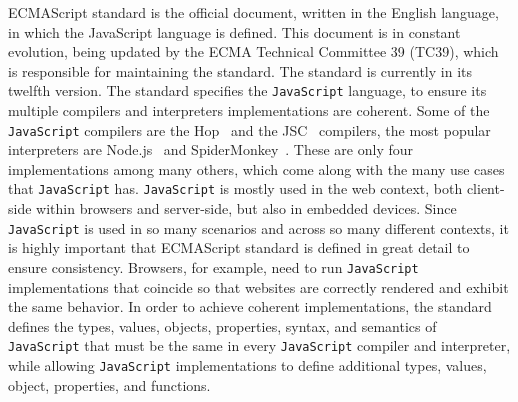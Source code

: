 \documentclass[runningheads]{llncs}
\begin{document}
ECMAScript standard\cite{ECMAScript} is the official document, written in the English language, in which the JavaScript language is defined. This document is in constant evolution, being updated by the ECMA Technical Committee 39 (TC39), which is responsible for maintaining the standard. The standard is currently in its twelfth version. 
%
The standard specifies the \texttt{JavaScript} language, to ensure its multiple compilers and interpreters implementations are coherent. Some of the \texttt{JavaScript} compilers are the Hop~\cite{Hop} and the JSC~\cite{JSC} compilers, the most popular interpreters are Node.js~\cite{Node.js} and SpiderMonkey~\cite{SpiderMonkey}. These are only four implementations among many others, which come along with the many use cases that \texttt{JavaScript} has.
%
\texttt{JavaScript} is mostly used in the web context, both client-side within browsers and server-side, but also in embedded devices. Since \texttt{JavaScript} is used in so many scenarios and across so many different contexts, it is highly important that ECMAScript standard is defined in great detail to ensure consistency. Browsers, for example, need to run \texttt{JavaScript} implementations that coincide so that websites are correctly rendered and exhibit the same behavior. In order to achieve coherent implementations, the standard defines the types, values, objects, properties, syntax, and semantics of \texttt{JavaScript} that must be the same in every \texttt{JavaScript} compiler and interpreter, while allowing \texttt{JavaScript} implementations to define additional types, values, object, properties, and functions.
\end{document}
